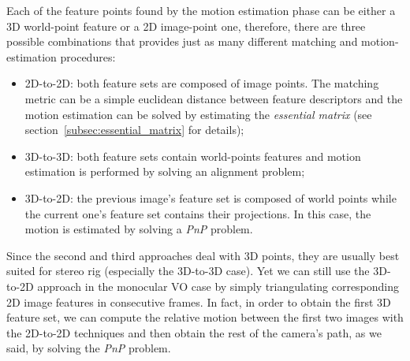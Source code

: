 Each of the feature points found by the motion estimation phase can be 
either a 3D world-point feature or a 2D image-point one,
therefore, there are three possible combinations that provides just as many 
different matching and motion-estimation procedures:
\begin{itemize}
	\item 2D-to-2D: both feature sets are composed of image points.
The matching metric can be a simple euclidean distance between feature 
descriptors and the motion estimation can be solved by estimating the 
\textit{essential matrix} (see section~\ref{subsec:essential_matrix} for 
details);
	\item 3D-to-3D: both feature sets contain world-points features and motion
estimation is performed by solving an alignment problem;
	\item 3D-to-2D: the previous image's feature set is composed of world points while
the current one's feature set contains their projections. In this case, the motion 
is estimated by solving a \textit{PnP} problem.
\end{itemize}
Since the second and third approaches deal with 3D points, they are usually 
best suited for stereo rig (especially the 3D-to-3D case).
Yet we can still use the 3D-to-2D approach in the monocular VO case by simply 
triangulating corresponding 2D image features in consecutive frames.
In fact, in order to obtain the first 3D feature set,
we can compute the relative motion between the first two images with 
the 2D-to-2D techniques and then obtain the rest of the camera's path,
as we said, by solving the \textit{PnP} problem.


